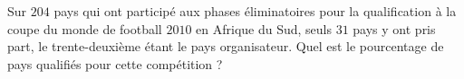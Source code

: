 
\begin{exercice}\label{exo2smath-0123}

Sur $204$ pays qui ont participé aux phases éliminatoires pour la qualification à la coupe du monde de football $2010$ en Afrique du Sud, seuls $31$ pays y ont pris part, le trente-deuxième étant le pays organisateur. Quel est le pourcentage de pays qualifiés pour cette compétition ?

\end{exercice}
